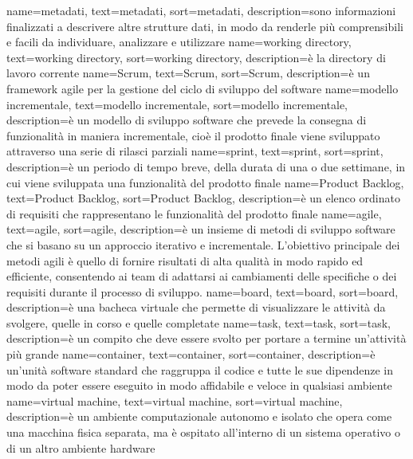 {
    name={metadati},
    text=metadati,
    sort=metadati,
    description={sono informazioni finalizzati a descrivere altre strutture dati, in modo da renderle più comprensibili e facili da individuare, analizzare e utilizzare}
}
{
    name={working directory},
    text=working directory,
    sort=working directory,
    description={è la directory di lavoro corrente}
}
{
    name={Scrum},
    text=Scrum,
    sort=Scrum,
    description={è un framework agile per la gestione del ciclo di sviluppo del software}
}
{
    name={modello incrementale},
    text=modello incrementale,
    sort=modello incrementale,
    description={è un modello di sviluppo software che prevede la consegna di funzionalità in maniera incrementale, cioè il prodotto finale viene 
    sviluppato attraverso una serie di rilasci parziali}
}
{
    name={sprint},
    text=sprint,
    sort=sprint,
    description={è un periodo di tempo breve, della durata di una o due settimane, in cui viene sviluppata 
    una funzionalità del prodotto finale}
}
{
    name={Product Backlog},
    text=Product Backlog,
    sort=Product Backlog,
    description={è un elenco ordinato di requisiti che rappresentano le funzionalità del prodotto finale}
}
{
    name={agile},
    text=agile,
    sort=agile,
    description={è un insieme di metodi di sviluppo software che si basano su un approccio iterativo e incrementale. 
    L'obiettivo principale dei metodi agili è quello di fornire risultati di alta qualità in modo rapido ed efficiente, consentendo ai team di adattarsi ai cambiamenti delle specifiche o dei requisiti durante il processo di sviluppo.}
}
{
    name={board},
    text=board,
    sort=board,
    description={è una bacheca virtuale che permette di visualizzare le attività da svolgere, quelle in corso e quelle completate}
}
{
    name={task},
    text=task,
    sort=task,
    description={è un compito che deve essere svolto per portare a termine un'attività più grande}
}
{
    name={container},
    text=container,
    sort=container,
    description={è un'unità software standard che raggruppa il codice e tutte le sue dipendenze in modo da poter essere eseguito in modo affidabile e veloce in qualsiasi ambiente}
}
{
    name={virtual machine},
    text=virtual machine,
    sort=virtual machine,
    description={è un ambiente computazionale autonomo e isolato che opera come una macchina fisica separata, ma è ospitato all'interno di un sistema operativo o di un altro ambiente hardware}
}
